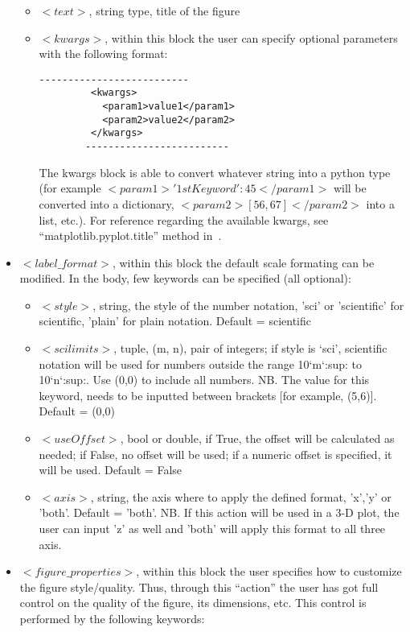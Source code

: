 \begin{itemize}
 \begin{itemize}
        \item \textit{$<text>$}, string type, title of the figure
        \item \textit{$<kwargs>$},  within this block the user can specify optional parameters with the following format:
        \begin{lstlisting}[style=XML]
        --------------------------
         <kwargs>
           <param1>value1</param1>
           <param2>value2</param2>
         </kwargs>
        -------------------------
       \end{lstlisting}
         The kwargs block is able to convert whatever string into a python type (for example $<param1>{'1stKeyword':45}</param1>$ will be converted into a dictionary, $<param2>[56,67]</param2>$ into a list, etc.). For reference regarding the available kwargs, see ``matplotlib.pyplot.title'' method in~\cite{MatPlotLib}.
      \end{itemize}
\item $<label\_format>$, within this block the default scale formating can be modified. In the body, few keywords can be specified (all optional):
 \begin{itemize}
        \item \textit{$<style>$}, string, the style of the number notation, 'sci' or 'scientific' for scientific, 'plain'  for plain notation. Default = scientific
        \item \textit{$<scilimits>$}, tuple, (m, n), pair of integers; if style is ‘sci’, scientific notation will be used for numbers outside the range 10`m`:sup: to 10`n`:sup:. Use (0,0) to include all numbers. NB. The value for this keyword, needs to be inputted between brackets [for example, (5,6)]. Default = (0,0)
        \item \textit{$<useOffset>$}, bool or double, if True, the offset will be calculated as needed; if False, no offset will be used; if a numeric offset is specified, it will be used. Default = False
        \item \textit{$<axis>$}, string, the axis where to apply the defined format, 'x','y' or 'both'. Default = 'both'. NB. If this action will be used in a 3-D plot, the user can input 'z' as well and 'both' will apply this format to all three axis.
      \end{itemize}
\item $<figure\_properties>$, within this block the user specifies how to customize the figure style/quality. Thus, through this ``action'' the user has got full control on the quality of the figure, its dimensions, etc. This control is performed by the following keywords: 

\end{itemize}
